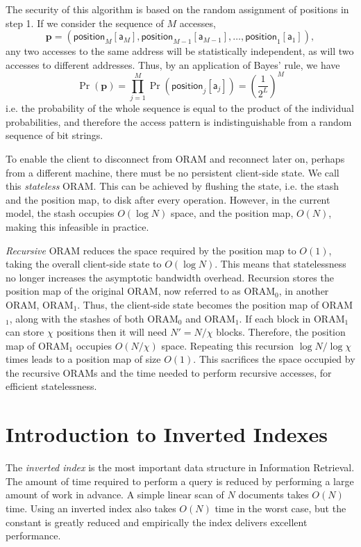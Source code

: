 \documentclass[12pt,a4paper,twoside,openright]{report}
\begin{document}
The security of this algorithm is based on the random assignment of positions in step 1. If we consider the sequence of $M$ accesses, $$\mathbf{p} = (\mathsf{position}_M[\mathsf{a}_M], \mathsf{position}_{M-1}[\mathsf{a}_{M-1}], \dots, \mathsf{position}_1[\mathsf{a}_1]),$$ any two accesses to the same address will be statistically independent, as will two accesses to different addresses. Thus, by an application of Bayes' rule, we have $$\Pr(\mathbf{p}) = \prod\limits^{M}_{j=1}\Pr(\mathsf{position}_j[\mathsf{a}_j]) = \left(\frac{1}{2^L}\right)^M$$ i.e. the probability of the whole sequence is equal to the product of the individual probabilities, and therefore the access pattern is indistinguishable from a random sequence of bit strings.

To enable the client to disconnect from ORAM and reconnect later on, perhaps from a different machine, there must be no persistent client-side state. We call this \emph{stateless} ORAM. This can be achieved by flushing the state, i.e. the stash and the position map, to disk after every operation. However, in the current model, the stash occupies $O(\log N)$ space, and the position map, $O(N)$, making this infeasible in practice.

\emph{Recursive} ORAM reduces the space required by the position map to $O(1)$, taking the overall client-side state to $O(\log N)$. This means that statelessness no longer increases the asymptotic bandwidth overhead. Recursion stores the position map of the original ORAM, now referred to as ORAM$_0$, in another ORAM, ORAM$_1$. Thus, the client-side state becomes the position map of ORAM$_1$, along with the stashes of both ORAM$_0$ and ORAM$_1$. If each block in ORAM$_1$ can store $\chi$ positions then it will need $N' = N/\chi$ blocks. Therefore, the position map of ORAM$_1$ occupies $O(N/\chi)$ space. Repeating this recursion $\log N / \log \chi$ times leads to a position map of size $O(1)$. This sacrifices the space occupied by the recursive ORAMs and the time needed to perform recursive accesses, for efficient statelessness.

\section{Introduction to Inverted Indexes}
\label{sec:invertedindexintro}

The \emph{inverted index} is the most important data structure in Information Retrieval. The amount of time required to perform a query is reduced by performing a large amount of work in advance. A simple linear scan of $N$ documents takes $O(N)$ time. Using an inverted index also takes $O(N)$ time in the worst case, but the constant is greatly reduced and empirically the index delivers excellent performance.
\end{document}
